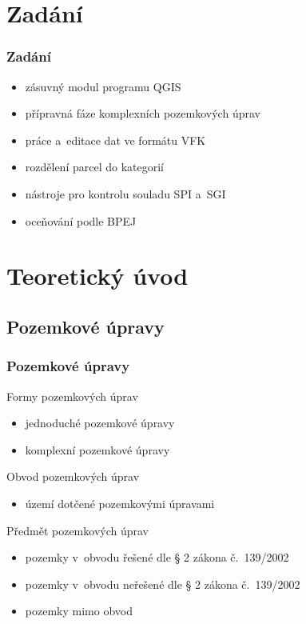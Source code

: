 \documentclass{beamer}
\begin{document}

\section{Zadání}

\begin{frame}

\frametitle{Zadání}

\begin{itemize}
	\item zásuvný modul programu QGIS
	\item přípravná fáze komplexních pozemkových úprav
	\item práce a~editace dat ve formátu VFK
	\item rozdělení parcel do kategorií
	\item nástroje pro kontrolu souladu SPI a~SGI
	\item oceňování podle BPEJ
\end{itemize}

\end{frame}


\section{Teoretický úvod}

\subsection{Pozemkové úpravy} %

\begin{frame}

\frametitle{Pozemkové úpravy}

Formy pozemkových úprav
\begin{itemize}
	\item jednoduché pozemkové úpravy
	\item komplexní pozemkové úpravy
\end{itemize}

\bigskip

Obvod pozemkových úprav
\begin{itemize}
	\item území dotčené pozemkovými úpravami
\end{itemize}

\bigskip

Předmět pozemkových úprav
\begin{itemize}
	\item pozemky v~obvodu řešené dle § 2 zákona č.~139/2002
	\item pozemky v~obvodu neřešené dle § 2 zákona č.~139/2002
	\item pozemky mimo obvod
\end{itemize}

\end{frame}
\end{document}
